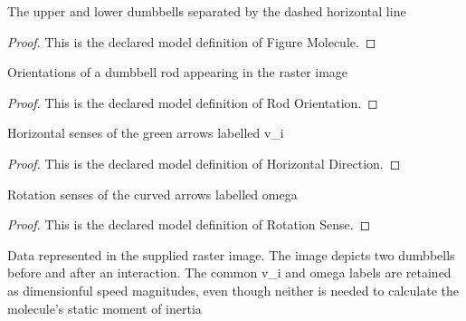 \begin{definition}
  \label{def:physics:phyx-mini-0335:phyxminiproblems-problemphyxmini0335-figuremolecule}
  The upper and lower dumbbells separated by the dashed horizontal line
\end{definition}
\begin{proof}
  This is the declared model definition of Figure Molecule.
\end{proof}
\begin{definition}
  \label{def:physics:phyx-mini-0335:phyxminiproblems-problemphyxmini0335-rodorientation}
  Orientations of a dumbbell rod appearing in the raster image
\end{definition}
\begin{proof}
  This is the declared model definition of Rod Orientation.
\end{proof}
\begin{definition}
  \label{def:physics:phyx-mini-0335:phyxminiproblems-problemphyxmini0335-horizontaldirection}
  Horizontal senses of the green arrows labelled v\_i
\end{definition}
\begin{proof}
  This is the declared model definition of Horizontal Direction.
\end{proof}
\begin{definition}
  \label{def:physics:phyx-mini-0335:phyxminiproblems-problemphyxmini0335-rotationsense}
  Rotation senses of the curved arrows labelled omega
\end{definition}
\begin{proof}
  This is the declared model definition of Rotation Sense.
\end{proof}
\begin{definition}
  \label{def:physics:phyx-mini-0335:phyxminiproblems-problemphyxmini0335-suppliedbeforeafterfigure}
  Data represented in the supplied raster image. The image depicts two dumbbells before and after an interaction. The common v\_i and omega labels are retained as dimensionful speed magnitudes, even though neither is needed to calculate the molecule's static moment of inertia
\end{definition}
